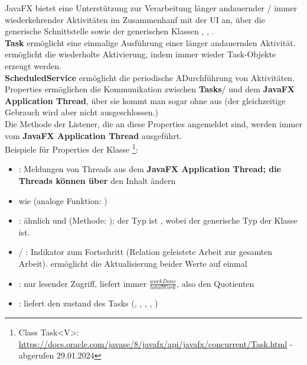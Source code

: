JavaFX bietet eine Unterstützung zur Verarbeitung länger andauernder / immer wiederkehrender Aktivitäten im Zusammenhanf mit der UI an, über die generische Schnittstelle  sowie der generischen Klassen , , .\\

\noindent
\textbf{Task} ermöglicht eine einmalige Ausführung einer länger andauernden Aktivität.\\

\noindent
{} ermöglicht die wiederholte Aktivierung, indem immer wieder Task-Objekte erzeugt werden.\\

\noindent
\textbf{ScheduledService} ermöglicht die periodische ADurchführung von Aktivitäten.\\

\noindent
Properties ermöglichen die Kommunikation zwischen \textbf{Tasks}/ und dem \textbf{JavaFX Application Thread}, über sie kommt man sogar ohne  aus (der gleichzeitige Gebrauch wird aber nicht ausgeschlossen.)\\

\noindent
Die Methode der Listener, die an diese Properties angemeldet sind, werden immer vom \textbf{JavaFX Application Thread} ausgeführt.\\

\noindent
Beispiele für Properties der Klasse \footnote{
Class Task<V>: \url{https://docs.oracle.com/javase/8/javafx/api/javafx/concurrent/Task.html} - abgerufen 29.01.2024
}:

\begin{itemize}
    \item {}: Meldungen von Threads aus dem \textbf{JavaFX Application Thread; die Threads können über } den Inhalt ändern
    \item {} wie  (analoge Funktion: )
    \item {}: ähnlich  und  (Methode: ); der Typ ist , wobei  der generische Typ der Klasse  ist.
    \item {} / : Indikator zum Fortschritt (Relation geleistete Arbeit zur gesamten Arbeit).
     ermöglicht die Aktualisierung beider Werte auf einmal
    \item {}: nur lesender Zugriff, liefert immer $\frac{workDone}{totalWork}$, also den Quotienten
    \item {}: liefert den zustand des Tasks (, , , , )
\end{itemize}


